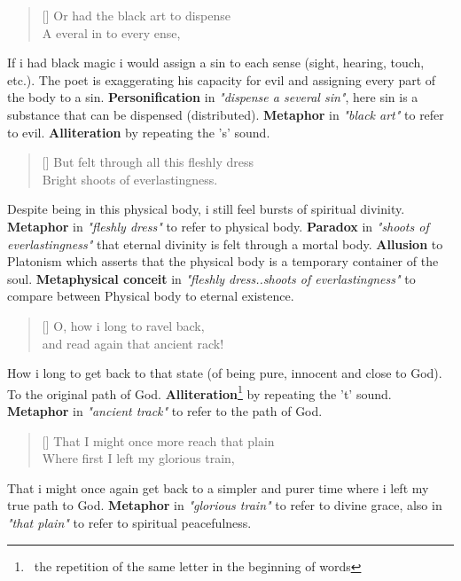 \documentclass[12pt, a4paper]{article}
\begin{document}
\begin{verse}[\versewidth]
{\fontverse
Or had the black art to dispense\\
A everal in to every ense, 
} 
\end{verse}

If i had black magic i would assign a sin to each sense (sight, hearing, touch, etc.).
The poet is exaggerating his capacity for evil and assigning every part of the body to a sin.
\textbf{Personification} in \textit{"dispense a several sin"}, here sin is a substance that
can be dispensed (distributed). \textbf{Metaphor} in \textit{"black art"} to refer
to evil. \textbf{Alliteration} by repeating the 's' sound.

\begin{verse}[\versewidth]
{\fontverse
But felt through all this fleshly dress\\
Bright shoots of everlastingness.
} 
\end{verse}

Despite being in this physical body, i still feel bursts of spiritual divinity.
 \textbf{Metaphor} in \textit{"fleshly dress"} to refer to physical body.
 \textbf{Paradox} in \textit{"shoots of everlastingness"} that eternal divinity is
felt through a mortal body. \textbf{Allusion} to Platonism which asserts
that the physical body is a temporary container of the soul. \textbf{Metaphysical conceit} 
in \textit{"fleshly dress..shoots of everlastingness"} to compare between 
Physical body to eternal existence.


\begin{verse}[\versewidth]
{\fontverse
O, how i long to ravel back,\\
and read again that ancient rack!
} 
\end{verse}

How i long to get back to that state (of being pure, innocent and close to God).
To the original path of God. \textbf{Alliteration}\footnote{\, 
the repetition of the same letter in the beginning of words} by repeating the 't' sound.
\textbf{Metaphor} in \textit{"ancient track"} to refer to the path of God.

\newpage
\begin{verse}[\versewidth]
{\fontverse
That I might once more reach that plain\\
Where first I left my glorious train, 
} 
\end{verse}

That i might once again get back to a simpler and purer time
where i left my true path to God. \textbf{Metaphor} in \textit{"glorious train"} 
to refer to divine grace, also in \textit{"that plain"} to refer to spiritual peacefulness.
\end{document}

